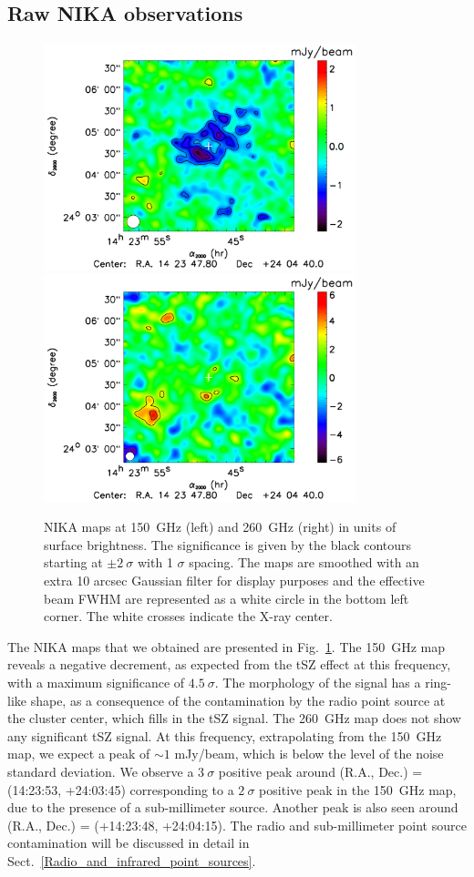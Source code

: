 \documentclass[twocolumn,traditabstract]{aa}
\begin{document}
\subsection{Raw NIKA observations}\label{sec:Raw_NIKA_observations}
\begin{figure}[h]
\centering
\includegraphics[height=6.6cm]{Figure/MACSJ1424_2mm_map.pdf}
\includegraphics[height=6.6cm]{Figure/MACSJ1424_1mm_map.pdf}
\caption{{\footnotesize NIKA maps at 150~GHz (left) and 260~GHz (right) in units of surface brightness. The significance is given by the black contours starting at $\pm 2 \ \sigma$ with 1 $\sigma$ spacing. The maps are smoothed with an extra 10 arcsec Gaussian filter for display purposes and the effective beam FWHM are represented as a white circle in the bottom left corner. The white crosses indicate the X-ray center.}}
\label{fig:flux_map}
\end{figure}
The NIKA maps that we obtained are presented in Fig.~\ref{fig:flux_map}. The 150~GHz map reveals a negative decrement, as expected from the tSZ effect at this frequency, with a maximum significance of $4.5 \ \sigma$. The morphology of the signal has a ring-like shape, as a consequence of the contamination by the radio point source at the cluster center, which fills in the tSZ signal. The 260~GHz map does not show any significant tSZ signal. At this frequency, extrapolating from the 150~GHz map, we expect a peak of $\sim 1$ mJy/beam, which is below the level of the noise standard deviation. We observe a $3 \ \sigma$ positive peak around (R.A., Dec.) = (14:23:53, +24:03:45) corresponding to a $2 \ \sigma$ positive peak in the 150~GHz map, due to the presence of a sub-millimeter source. Another peak is also seen around (R.A., Dec.) = (+14:23:48, +24:04:15). The radio and sub-millimeter point source contamination will be discussed in detail in Sect.~\ref{Radio_and_infrared_point_sources}.
\end{document}
